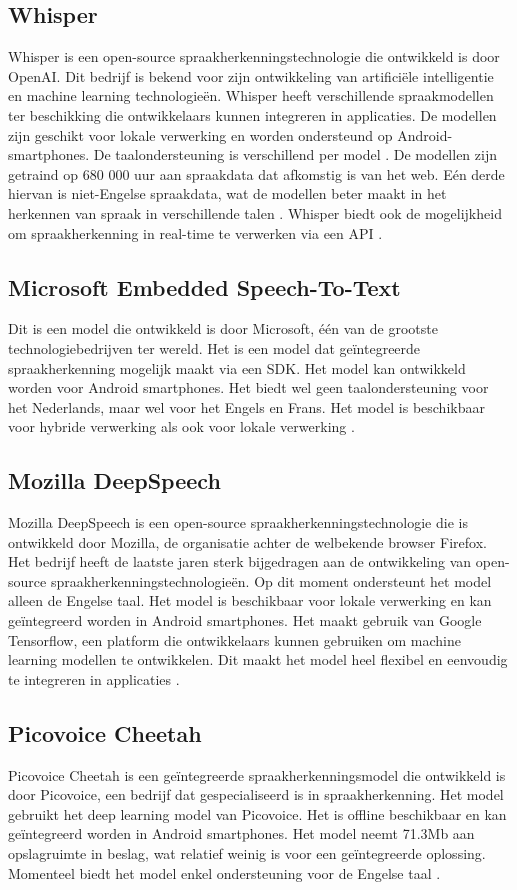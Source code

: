 \subsection{Whisper}
Whisper is een open-source spraakherkenningstechnologie die ontwikkeld is door OpenAI. Dit bedrijf is bekend voor zijn ontwikkeling van artificiële intelligentie en machine learning technologieën. Whisper heeft verschillende spraakmodellen ter beschikking die ontwikkelaars kunnen integreren in applicaties. De modellen zijn geschikt voor lokale verwerking en worden ondersteund op Android-smartphones. De taalondersteuning is verschillend per model \autocite{Griffiths2023}. De modellen zijn getraind op 680 000 uur aan spraakdata dat afkomstig is van het web. Eén derde hiervan is niet-Engelse spraakdata, wat de modellen beter maakt in het herkennen van spraak in verschillende talen \autocite{OpenAI2023}. 
 Whisper biedt ook de mogelijkheid om spraakherkenning in real-time te verwerken via een API \autocite{Griffiths2023}.

\subsection{Microsoft Embedded Speech-To-Text}
Dit is een model die ontwikkeld is door Microsoft, één van de grootste technologiebedrijven ter wereld. Het is een model dat geïntegreerde spraakherkenning mogelijk maakt via een SDK. Het model kan ontwikkeld worden voor Android smartphones. Het biedt wel geen taalondersteuning voor het Nederlands, maar wel voor het Engels en Frans. Het model is beschikbaar voor hybride verwerking als ook voor lokale verwerking \autocite{Shah2023}.

\subsection{Mozilla DeepSpeech}
Mozilla DeepSpeech is een open-source spraakherkenningstechnologie die is ontwikkeld door Mozilla, de organisatie achter de welbekende browser Firefox. Het bedrijf heeft de laatste jaren sterk bijgedragen aan de ontwikkeling van open-source spraakherkenningstechnologieën. Op dit moment ondersteunt het model alleen de Engelse taal. Het model is beschikbaar voor lokale verwerking en kan geïntegreerd worden in Android smartphones. Het maakt gebruik van Google Tensorflow, een platform die ontwikkelaars kunnen gebruiken om machine learning modellen te ontwikkelen. Dit maakt het model heel flexibel en eenvoudig te integreren in applicaties \autocite{Tang2021}.

\subsection{Picovoice Cheetah}
Picovoice Cheetah is een geïntegreerde spraakherkenningsmodel die ontwikkeld is door Picovoice, een bedrijf dat gespecialiseerd is in spraakherkenning. Het model gebruikt het deep learning model van Picovoice. Het is offline beschikbaar en kan geïntegreerd worden in Android smartphones. Het model neemt 71.3Mb aan opslagruimte in beslag, wat relatief weinig is voor een geïntegreerde oplossing. Momenteel biedt het model enkel ondersteuning voor de Engelse taal \autocite{Halfacree2022}.